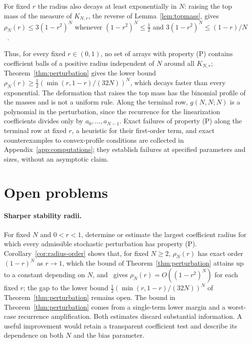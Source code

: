 For fixed $r$ the radius also decays at least exponentially in $N$: raising the top mass of the measure of $K_{N,r}$, the reverse of Lemma~\ref{lem:topmass}, gives $\rho_N(r)\leq3(1-r^2)^N$ whenever $(1-r^2)^N\leq\frac12$ and $3(1-r^2)^N\leq(1-r)/N$~\cite[Proposition~ and Corollary~]{P1}.

Thus, for every fixed $r\in(0,1)$, no set of arrays with property (P) contains coefficient balls of a positive radius independent of $N$ around all $K_{N,r}$; Theorem~\ref{thm:perturbation} gives the lower bound $\rho_N(r)\geq\tfrac12(\min(r,1-r)/(32N))^N$, which decays faster than every exponential. The deformation that raises the top mass has the binomial profile of the masses and is not a uniform rule. Along the terminal row, $g(N,N;N)$ is a polynomial in the perturbation, since the recurrence for the linearization coefficients divides only by $a_0,\ldots,a_{N-1}$. Exact failures of property (P) along the terminal row at fixed $r$, a heuristic for their first-order term, and exact counterexamples to convex-profile conditions are collected in Appendix~\ref{app:computations}; they establish failures at specified parameters and sizes, without an asymptotic claim.

\section{Open problems}\label{sec:open}

\paragraph{Sharper stability radii.}
For fixed $N$ and $0<r<1$, determine or estimate the largest coefficient radius for which every admissible stochastic perturbation has property (P). Corollary~\ref{cor:radius-order} shows that, for fixed $N\geq2$, $\rho_N(r)$ has exact order $(1-r)^N$ as $r\to1$, which the bound of Theorem~\ref{thm:perturbation} attains up to a constant depending on $N$, and~\cite[Corollary~]{P1} gives $\rho_N(r)=O((1-r^2)^N)$ for each fixed $r$; the gap to the lower bound $\tfrac12(\min(r,1-r)/(32N))^N$ of Theorem~\ref{thm:perturbation} remains open. The bound in Theorem~\ref{thm:perturbation} comes from a single-term lower margin and a worst-case recurrence amplification. Both estimates discard substantial information. A useful improvement would retain a transparent coefficient test and describe its dependence on both $N$ and the bias parameter.

